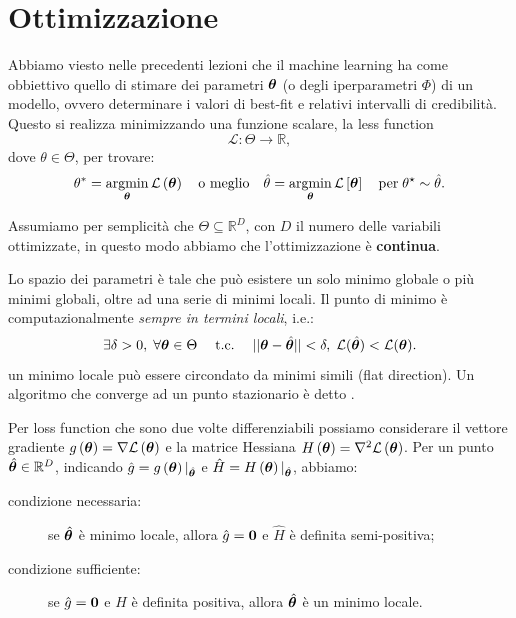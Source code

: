 \documentclass[10pt]{article}
\begin{document}
\section{Ottimizzazione}
    Abbiamo viesto nelle precedenti lezioni che il machine learning ha come
    obbiettivo quello di stimare dei parametri \( \bm{\theta} \) (o degli iperparametri
    \( \Phi \)) di un modello, ovvero determinare i valori di best-fit e relativi
    intervalli di credibilità. Questo si realizza minimizzando una funzione
    scalare, la less function
    \[
        \mathcal{L}: \Theta\rightarrow\mathbb{R},
    \]
    dove \( \theta\in\Theta \), per trovare:
    \[
        \theta^* = \operatorname*{argmin}_{\bm{\theta}} \mathcal{L}\left( \bm{\theta} \right) \quad\text{o meglio}\quad
        \hat{\theta}=\operatorname*{argmin}_{\bm{\theta}} \mathcal{L}\left[ \bm{\theta} \right] \quad\text{per}\;
        \theta^\star \sim \hat{\theta}.
    \]

    Assumiamo per semplicità che \( \Theta \subseteq \mathbb{R}^D \), con \(D\) il numero
    delle variabili ottimizzate, in questo modo abbiamo che l'ottimizzazione
    è \textbf{continua}.

    \begin{observation}
        Lo spazio dei parametri è tale che può esistere un solo minimo globale o
        più minimi globali, oltre ad una serie di minimi locali. Il punto di
        minimo è computazionalmente \textit{sempre in termini locali}, i.e.:
        \[
            \exists \delta > 0 ,\; \forall\bm{\theta}\in\Theta  \quad\;\text{t.c.}\;\quad
            || \bm{\theta} - \hat{\bm{\theta}} || < \delta ,\;
            \mathcal{L} (\hat{\bm{\theta}}) < \mathcal{L} (\bm{\theta}).
        \]
        un minimo locale può essere circondato da minimi simili (flat direction).
        Un algoritmo che converge ad un punto stazionario è detto
        .
    \end{observation}

    \begin{observation}
        Per loss function che sono due volte differenziabili possiamo considerare
        il vettore gradiente \( g\left( \bm{\theta} \right) = \nabla\mathcal{L}\left( \bm{\theta} \right) \) e
        la matrice Hessiana \( H\left( \bm{\theta} \right)  = \nabla^2 \mathcal{L}\left( \bm{\theta} \right) \).
        Per un punto \( \hat{\bm{\theta}} \in \mathbb{R}^D \), indicando \( \hat{g} = g\left( \bm{\theta} \right)|_{\hat{\bm{\theta}}} \)
        e \( \hat{H} = H\left( \bm{\theta	} \right)|_{\hat{\bm{\theta}}} \), abbiamo:
        \begin{description}
            \item[condizione necessaria:] se \(\hat{\bm{\theta}}\) è minimo locale, allora \( \hat{g} = \bm{0} \) e \(\hat{H}\) è definita semi-positiva;
            \item[condizione sufficiente:] se \(\hat{g} = \bm{0}\) e  \( H \) è definita positiva, allora \(\hat{\bm{\theta}}\) è un minimo locale.
        \end{description}
    \end{observation}
\end{document}
